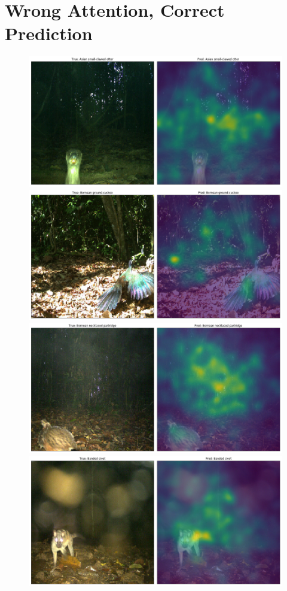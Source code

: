 \documentclass[journal, a4paper]{IEEEtran}
\begin{document}
\section{Wrong Attention, Correct Prediction}
	\begin{figure}[!hbt]
		\begin{center}
		\includegraphics[width=\columnwidth]{images/No_Attention_right.png}
		\includegraphics[width=\columnwidth]{images/No_Attention_right2.png}
		\includegraphics[width=\columnwidth]{images/No_Attention_right3.png}
		\includegraphics[width=\columnwidth]{images/Attention_Drops.png}

\end{center}
\end{figure}
\end{document}
